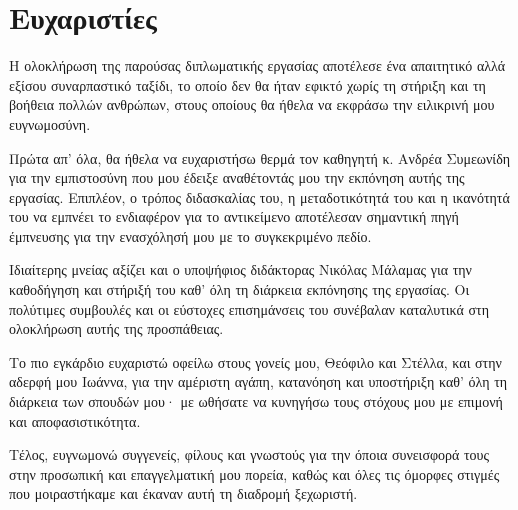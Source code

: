 \section*{Ευχαριστίες}
{}

Η ολοκλήρωση της παρούσας διπλωματικής εργασίας αποτέλεσε ένα απαιτητικό αλλά εξίσου συναρπαστικό ταξίδι, το οποίο δεν θα ήταν εφικτό χωρίς τη στήριξη και τη βοήθεια πολλών ανθρώπων, στους οποίους θα ήθελα να εκφράσω την ειλικρινή μου ευγνωμοσύνη.

Πρώτα απ' όλα, θα ήθελα να ευχαριστήσω θερμά τον καθηγητή κ. Ανδρέα Συμεωνίδη για την εμπιστοσύνη που μου έδειξε αναθέτοντάς μου την εκπόνηση αυτής της εργασίας. Επιπλέον, ο τρόπος διδασκαλίας του, η μεταδοτικότητά του και η ικανότητά του να εμπνέει το ενδιαφέρον για το αντικείμενο αποτέλεσαν σημαντική πηγή έμπνευσης για την ενασχόλησή μου με το συγκεκριμένο πεδίο.

Ιδιαίτερης μνείας αξίζει και ο υποψήφιος διδάκτορας Νικόλας Μάλαμας για την καθοδήγηση και στήριξή του καθ' όλη τη διάρκεια εκπόνησης της εργασίας. Οι πολύτιμες συμβουλές και οι εύστοχες επισημάνσεις του συνέβαλαν καταλυτικά στη ολοκλήρωση αυτής της προσπάθειας.

Το πιο εγκάρδιο ευχαριστώ οφείλω στους γονείς μου, Θεόφιλο και Στέλλα, και στην αδερφή μου Ιωάννα, για την αμέριστη αγάπη, κατανόηση και υποστήριξη καθ' όλη τη διάρκεια των σπουδών μου· με ωθήσατε να κυνηγήσω τους στόχους μου με επιμονή και αποφασιστικότητα. 

Τέλος, ευγνωμονώ συγγενείς, φίλους και γνωστούς για την όποια
συνεισφορά τους στην προσωπική και επαγγελματική μου πορεία, καθώς και όλες τις όμορφες στιγμές που μοιραστήκαμε και έκαναν αυτή τη διαδρομή ξεχωριστή.
